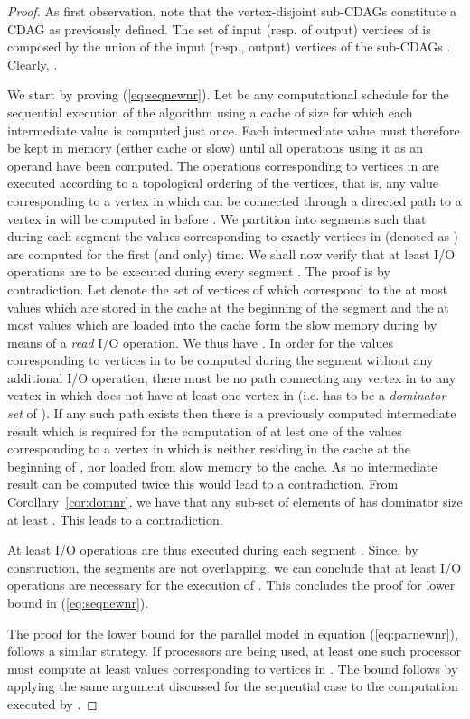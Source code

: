 \documentclass[a4paper,UKenglish]{lipics-v2016}
\newcommand{\io }{I/O }
\begin{document}
\begin{proof}
	As first observation, note that the  vertex-disjoint sub-CDAGs  constitute a  CDAG as previously defined. The set  of input (resp.  of output) vertices of  is composed by the union of the input (resp., output) vertices of the  sub-CDAGs . Clearly, .
	
	We start by proving (\ref{eq:seqnewnr}). Let  be any computational schedule for the sequential execution of the algorithm  using a cache of size  for which each intermediate value is computed just once. Each intermediate value must therefore be kept in memory (either cache or slow) until all operations using it as an operand have been computed. The operations corresponding to vertices in  are executed according to a topological ordering of the vertices, that is, any value corresponding to a vertex in  which can be connected through a directed path to a vertex in  will be computed in  before . We partition  into  segments such that during each segment  the values corresponding to exactly  vertices in  (denoted as ) are computed for the first (and only) time.	
	We shall now verify that at least  \io operations are to be executed during every segment . The proof is by contradiction.   
	 Let  denote the set of vertices of  which correspond to the at most  values which are  stored in the cache at the beginning of the segment and the at most  values which are loaded into the cache form the slow memory during  by means of a \emph{read} \io operation. We thus have .
	  In order for the  values corresponding to vertices in  to be computed during the segment without any additional \io operation, there must be no path connecting any vertex in  to any vertex in  which does not have at least one vertex in  (i.e.  has to be a \emph{dominator set} of ). If any such path exists then there is a previously computed intermediate result  which is required for the computation of at lest one of the values corresponding to a vertex in  which is neither residing in the cache at the beginning of , nor loaded from slow memory to the cache. As no intermediate result can be computed twice this would lead to a contradiction.  From Corollary~\ref{cor:domnr}, we have that any sub-set of  elements of  has dominator size at least . This leads to a contradiction.
	
	At least  \io operations are thus executed during each segment . Since, by construction, the  segments are not overlapping, we can conclude that at least  \io operations are necessary for the execution of . This concludes the proof for lower bound in (\ref{eq:seqnewnr}).
	
	The proof for the lower bound for the parallel model in equation (\ref{eq:parnewnr}), follows a similar strategy. If  processors are being used, at least one such processor  must compute at least  values corresponding to vertices in . The bound follows by applying the same argument discussed for the sequential case to the computation executed by .
	\end{proof}
\end{document}
